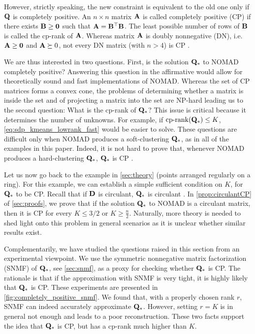 \documentclass[twoside,11pt]{article}
\begin{document}
However, strictly speaking, the new constraint is equivalent to the old one only if ${\mathbf{Q}}$ is completely positive.
An $n \times n$ matrix ${\mathbf{A}}$  is called completely positive (CP) if there exists ${\mathbf{B}} \geq {\mathbf{0}}$ such that ${\mathbf{A}} = {{\mathbf{B}}}^\top {\mathbf{B}}$. The least possible number of rows of ${\mathbf{B}}$ is called the cp-rank of ${\mathbf{A}}$. Whereas matrix ${\mathbf{A}}$ is doubly nonnegative (DN), i.e. ${\mathbf{A}} \geq {\mathbf{0}}$ and ${\mathbf{A}} \succeq 0$, not every DN matrix (with $n  > 4$) is CP \citep{Maxfield1962}.

We are thus interested in two questions.
First, is the solution ${\mathbf{Q}}_*$ to NOMAD completely positive? Answering this question in the affirmative would allow for theoretically sound and fast implementations of NOMAD. Whereas the set of CP matrices forms a convex cone, the problems of determining whether a matrix is inside the set and of projecting a matrix into the set are NP-hard leading us to the second question: What is the cp-rank of ${\mathbf{Q}}_*$? This issue is critical because it determines the number of unknowns. For example, if $\operatorname{cp-rank}({\mathbf{Q}}_*) \leq K$, \eqref{eq:sdp_kmeans_lowrank_fast} would be easier to solve. These questions are difficult only when NOMAD produces a soft-clustering ${\mathbf{Q}}_*$, as in all of the examples in this paper. Indeed, it is not hard to prove that, whenever NOMAD produces a hard-clustering ${\mathbf{Q}}_*$, ${\mathbf{Q}}_*$ is CP \citep[see][for such conditions]{Awasthi2015}.

Let us now go back to the example in \cref{sec:theory} (points arranged regularly on a ring). For this example, we can establish a simple sufficient condition on $K$, for ${\mathbf{Q}}_*$ to be CP. Recall that if ${\mathbf{D}}$ is circulant, ${\mathbf{Q}}_*$ is circulant \citep{Bachoc2012}.
In \cref{prop:circulantCP} of \cref{sec:proofs}, we prove that if the solution ${\mathbf{Q}}_*$ to NOMAD is a circulant matrix, then it is CP for every $K \leq 3/2$ or $K \geq \tfrac{n}{2}$.
Naturally, more theory is needed to shed light onto this problem in general scenarios as it is unclear whether similar results exist.

Complementarily, we have studied the questions raised in this section from an experimental viewpoint. We use the symmetric nonnegative matrix factorization (SNMF) of ${\mathbf{Q}}_*$, see \cref{sec:snmf}, as a proxy for checking whether ${\mathbf{Q}}_*$ is CP. The rationale is that if the approximation with SNMF is very tight, it is highly likely that ${\mathbf{Q}}_*$ is CP. These experiments are presented in \cref{fig:completely_positive_snmf}. We found that, with a properly chosen rank $r$, SNMF can  indeed accurately approximate ${\mathbf{Q}}_*$. However, setting $r=K$ is in general not enough and leads to a poor reconstruction. These two facts support the idea that ${\mathbf{Q}}_*$ is CP, but has a cp-rank much higher than $K$.
\end{document}
